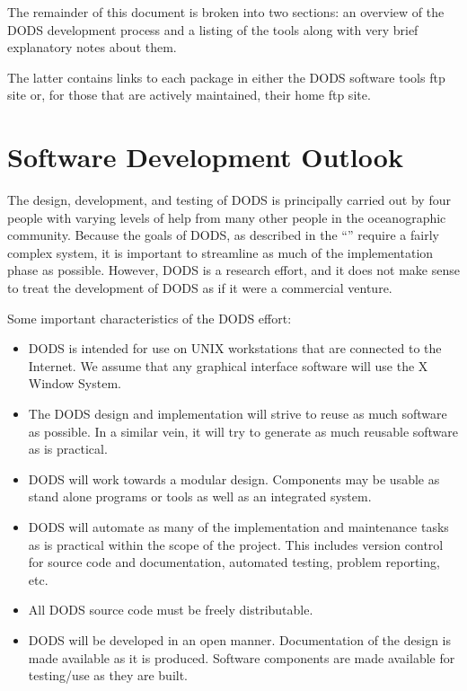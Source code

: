 The remainder of this document is broken into two sections: an overview of
the DODS development process and a listing of the tools along with very
brief explanatory notes about them. 
\begin{htmlonly}
The latter contains links to each package in either the DODS software tools
ftp site or, for those that are actively maintained, their home ftp site.
\end{htmlonly}

\section{Software Development Outlook}

The design, development, and testing of DODS is principally carried out by
four people with varying levels of help from many other people in the
oceanographic community. Because the goals of DODS, as described in the
``\wrkshp'' require a fairly complex system, it is important to streamline
as much of the implementation phase as possible. However, DODS is a research
effort, and it does not make sense to treat the development of DODS as if it
were a commercial venture.

Some important characteristics of the DODS effort:

\begin{itemize}

\item DODS is intended for use on UNIX workstations that are connected to the
  Internet. We assume that any graphical interface software will use the X
  Window System.

\item The DODS design and implementation will strive to reuse as much
  software as possible. In a similar vein, it will try to generate as much
  reusable software as is practical.

\item DODS will work towards a modular design. Components may be usable as
  stand alone programs or tools as well as an integrated system.

\item DODS will automate as many of the implementation and maintenance tasks
  as is practical within the scope of the project. This includes version
  control for source code and documentation, automated testing, problem
  reporting, etc.

\item All DODS source code must be freely distributable.

\item DODS will be developed in an open manner. Documentation of the design
  is made available as it is produced. Software components are made available
  for testing/use as they are built.

\end{itemize}

